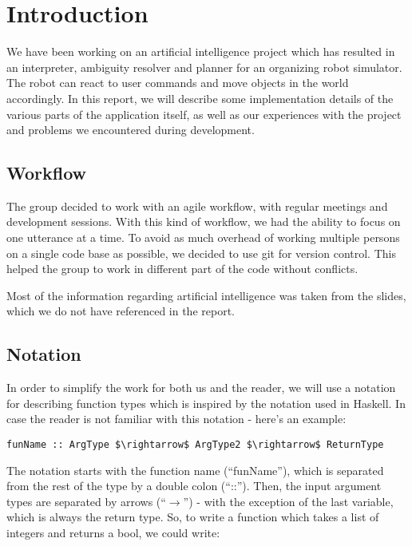 \section*{Introduction}
We have been working on an artificial intelligence project which has resulted in an interpreter, ambiguity resolver and planner for an organizing robot simulator.
The robot can react to user commands and move objects in the world accordingly.
In this report, we will describe some implementation details of the various parts of the application itself, as well as our experiences with the project and problems we encountered during development.

\subsection*{Workflow}
The group decided to work with an agile workflow, with regular meetings and development sessions.
With this kind of workflow, we had the ability to focus on one utterance at a time.
To avoid as much overhead of working multiple persons on a single code base as possible, we decided to use git for version control.
This helped the group to work in different part of the code without conflicts.

Most of the information regarding artificial intelligence was taken from the slides, which we do not have referenced in the report.

\subsection*{Notation}
In order to simplify the work for both us and the reader, we will use a notation for describing function types which is inspired by the notation used in Haskell.
In case the reader is not familiar with this notation - here's an example:

\begin{lstlisting}
funName :: ArgType $\rightarrow$ ArgType2 $\rightarrow$ ReturnType
\end{lstlisting}

The notation starts with the function name (``funName''), which is separated from the rest of the type by a double colon (``::'').
Then, the input argument types are separated by arrows (``$\rightarrow$'') - with the exception of the last variable, which is always the return type.
So, to write a function which takes a list of integers and returns a bool, we could write:

